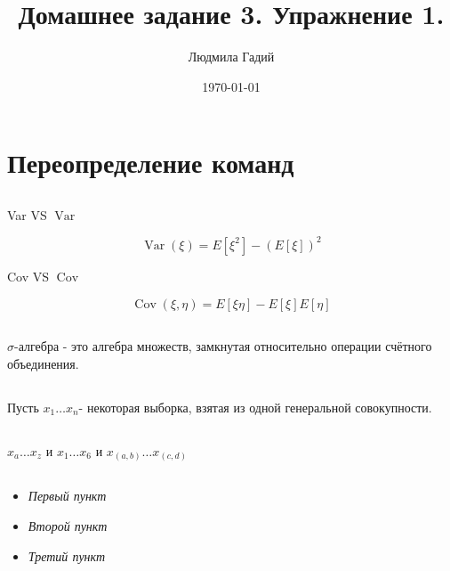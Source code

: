 \documentclass[12pt, a4paper]{article}
\title{Домашнее задание 3. Упражнение 1.}
\author{Людмила Гадий}
\date{\today}
\theoremstyle{plain}              %
\theoremstyle{definition}         %
\DeclareMathOperator{\Var}{Var}
\DeclareMathOperator{\Cov}{Cov}
\begin{document}
\maketitle

\section{Переопределение команд}
\subsection{}
\begin{center}
Var VS $\Var$
\end{center}
\[ \Var(\xi)= E[\xi^2]-(E[\xi])^2 \]

\begin{center}
Cov VS $\Cov$
\end{center}
\[ \Cov(\xi,\eta)= E[\xi\eta]-E[\xi]E[\eta] \]

\subsection{}
\def \s{\ensuremath{\sigma}}
\s-алгебра - это алгебра множеств, замкнутая относительно операции счётного объединения.

\subsection{}
\newcommand{\xnn}{\ensuremath{x_1 \ldots x_n}}
Пусть \xnn - некоторая выборка, взятая из одной генеральной совокупности.

\subsection{}
\newcommand{\com}[2]{\ensuremath{x_{#1} \ldots x_{#2}}} 

\com{a}{z} и \com{1}{6} и \com{(a,b)}{(c,d)}

\subsection{}
\begin{itemize}
\renewcommand{\labelitemi}{${\color{blue}\bullet}$}
  \item \textit{Первый пункт}
  \item \textit{Второй пункт}
  \item \textit{Третий пункт}
\end{itemize}
\end{document}
